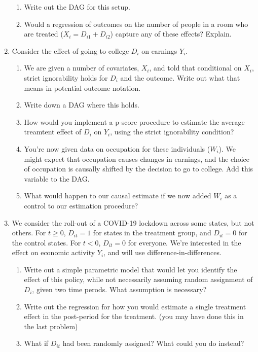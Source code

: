 \documentclass[11pt, a4paper]{article}
\begin{document}
\begin{enumerate}
\begin{enumerate}
    \item Write out the DAG for this setup.
    \item Would a regression of outcomes on the number of people in a
      room who are treated ($X_{i} = D_{i1} + D_{i2}$) capture any of
      these effects? Explain.
    \end{enumerate}
  \item Consider the effect of going to college $D_{i}$ on earnings
    $Y_{i}$.
    \begin{enumerate}
    \item We are given a number of covariates, $X_{i}$, and told that
      conditional on $X_{i}$, strict ignorability holds for $D_{i}$
      and the outcome. Write out what that means in potential outcome notation.
    \item Write down a DAG where this holds.
    \item How would you implement a p-score procedure to estimate the
      average treamtent effect of $D_{i}$ on $Y_{i}$, using the strict
      ignorability condition?
    \item You're now given data on occupation for these individuals
      ($W_{i}$). We might expect that occupation causes changes in
      earnings, and the choice of occupation is causally shifted by
      the decision to go to college. Add this variable to the DAG.
    \item What would happen to our causal estimate if we now added
      $W_{i}$ as a control to our estimation procedure?
    \end{enumerate}
  \item We consider the roll-out of a COVID-19 lockdown across some
    states, but not others. For $t \geq 0$, $D_{it} = 1$ for states in
    the treatment group, and $D_{it} = 0$ for the control states. For
    $t < 0$, $D_{it} = 0$ for everyone. We're interested in the effect
    on economic activity $Y_{i}$, and will use difference-in-differences.
    \begin{enumerate}
    \item Write out a simple parametric model that would let you
      identify the effect of this policy, while not necessarily
      assuming random assignment of $D_{i}$, given two time
      perods. What assumption is necessary?
    \item Write out the regression for how you would estimate a single
      treatment effect in the post-period for the treatment. (you may have done this in the last problem)
    \item What if $D_{it}$ had been randomly assigned? What could you do instead?

\end{enumerate}
\end{enumerate}
\end{document}
